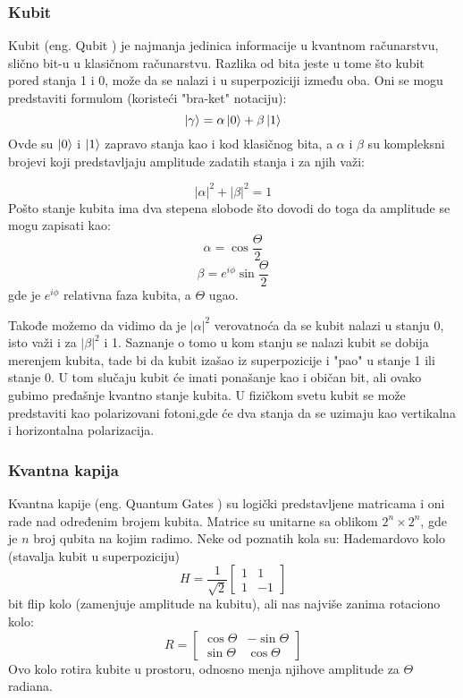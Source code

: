 \documentclass[12pt, letterpaper, oneside]{article}
\begin{document}
\subsubsection*{Kubit}
Kubit (eng. Qubit ) je najmanja jedinica informacije u kvantnom računarstvu, slično bit-u u klasičnom računarstvu.
Razlika od bita jeste u tome što kubit pored stanja 1 i 0, može da se nalazi i u superpoziciji između oba.
Oni se mogu predstaviti formulom (koristeći "bra-ket" notaciju):
\[ \ket{\gamma} =  \alpha\ket{0}+\beta\ket{1} \]
Ovde su $\ket{0}$ i $\ket{1}$ zapravo stanja kao i kod klasičnog bita, a $\alpha$ i $\beta$ su kompleksni brojevi koji predstavljaju amplitude zadatih stanja i za njih važi:

\[ |\alpha|^2+|\beta|^2 = 1 \]
Pošto stanje kubita ima dva stepena slobode što dovodi do toga da amplitude se mogu zapisati kao:
\[
    \alpha = \cos{\frac{\Theta}{2}} 
\]
\[
    \beta = e^{i\phi}\sin{\frac{\Theta}{2}}
\]
gde je $e^{i\phi}$ relativna faza kubita, a $\Theta$ ugao.

Takođe možemo da vidimo da je $|\alpha|^2$ verovatnoća da se kubit nalazi u stanju 0, isto važi i za $ |\beta|^2$ i 1.
Saznanje o tomo u kom stanju se nalazi kubit se dobija merenjem kubita, tade bi da kubit izašao iz superpozicije i "pao" u stanje 1 ili stanje 0. U tom slučaju kubit će imati ponašanje kao i običan bit, ali ovako gubimo pređašnje kvantno stanje kubita.
U fizičkom svetu kubit se može predstaviti kao polarizovani fotoni,gde će dva stanja da se uzimaju kao vertikalna i horizontalna polarizacija.
\subsubsection*{Kvantna kapija}
Kvantna kapije (eng. Quantum Gates ) su logički predstavljene matricama i oni rade nad određenim brojem kubita.
Matrice su unitarne sa oblikom $2^n \times 2^n$, gde je $n$ broj qubita na kojim radimo. Neke od poznatih kola su: Hademardovo kolo (stavalja kubit u superpoziciju)
\[
    H = \frac{1}{\sqrt{2}}\begin{bmatrix}
        1 & 1 \\
        1 & -1
    \end{bmatrix}
\]
bit flip kolo (zamenjuje amplitude na kubitu), ali nas najviše zanima rotaciono kolo:
\[
    R = \begin{bmatrix}
        \cos{\Theta} & -\sin{\Theta} \\
        \sin{\Theta} & \cos{\Theta} 
    \end{bmatrix}
\]
Ovo kolo rotira kubite u prostoru, odnosno menja njihove amplitude za $\Theta$ radiana.
\end{document}
